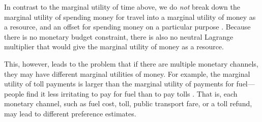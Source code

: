 
In contrast to the marginal utility of time above, we do \emph{not} break down the marginal utility of spending money for travel into a marginal utility of money as a resource, and an offset for spending money on a particular purpose \citep[for an example of this decomposition, see, e.g.][]{MunizagaEtAl2008TimeAllocationModeChoice}.  Because there is no monetary budget constraint, there is also no neutral Lagrange multiplier that would give the marginal utility of money as a resource.

This, however, leads to the problem that if there are multiple monetary channels, they may have different marginal utilities of money.  For example, the marginal utility of toll payments is larger than the marginal utility of payments for fuel---\ie people find it less irritating to pay for fuel than to pay tolls 
%
%
\citep[see, e.g.,][]{VrticEtc2008ReisekostenSVIBericht}.
%
That is, each monetary channel, such as fuel cost, toll, public transport fare, or a toll refund, may lead to different preference estimates.

